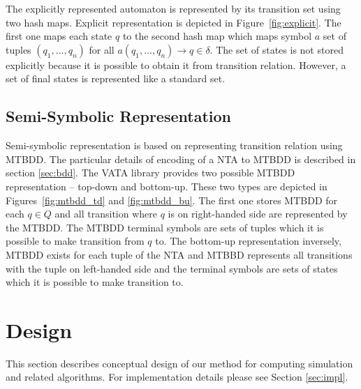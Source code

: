 \documentclass[a4paper, 12pt]{article}
\begin{document}
The explicitly represented automaton is represented by its transition set using two hash maps. Explicit representation is depicted in Figure~\ref{fig:explicit}.
The first one maps each state $q$ to the second hash map which maps symbol $a$ set of tuples $(q_1,\ldots,q_n)$ for all $a(q_1, \ldots, q_n) \rightarrow q \in \delta$.
The set of states is not stored explicitly because it is possible to obtain it from transition relation.
However, a set of final states is represented like a standard set.

\subsection{Semi-Symbolic Representation}

Semi-symbolic representation is based on representing transition relation using MTBDD.
The particular details of encoding of a NTA to MTBDD is described in section \ref{sec:bdd}.
The VATA library provides two possible MTBDD representation -- top-down and bottom-up. These two types are depicted in Figures~\ref{fig:mtbdd_td} and \ref{fig:mtbdd_bu}. 
The first one stores MTBDD for each $q \in Q$ and all transition where $q$ is on right-handed side
are represented by the MTBDD.
The MTBDD terminal symbols are sets of tuples which it is possible to make transition from $q$ to.
The bottom-up representation inversely, MTBDD exists for each tuple of the NTA and MTBBD represents all transitions with
the tuple on left-handed side and the terminal symbols are sets of states which it is possible to make transition to.

\section{Design}
\label{sec:design}

This section describes conceptual design of our method for computing simulation and related algorithms.
For implementation details please see Section \ref{sec:impl}.
\end{document}
